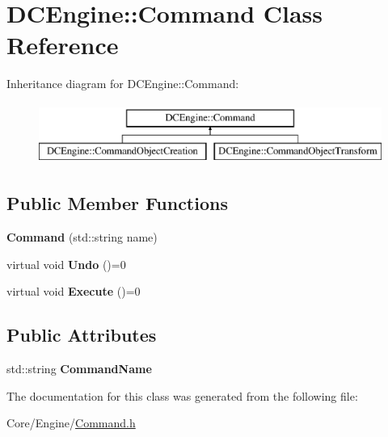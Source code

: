\hypertarget{classDCEngine_1_1Command}{\section{D\-C\-Engine\-:\-:Command Class Reference}
\label{classDCEngine_1_1Command}
}
Inheritance diagram for D\-C\-Engine\-:\-:Command\-:\begin{figure}[H]
\begin{center}
\leavevmode
\includegraphics[height=2.000000cm]{classDCEngine_1_1Command}
\end{center}
\end{figure}
\subsection*{Public Member Functions}
\begin{DoxyCompactItemize}
\item 
\hypertarget{classDCEngine_1_1Command_aa35f7e42932a9d03da8df6add2a7c5d5}{{\bfseries Command} (std\-::string name)}\label{classDCEngine_1_1Command_aa35f7e42932a9d03da8df6add2a7c5d5}

\item 
\hypertarget{classDCEngine_1_1Command_a43a8d631d2b3a250a4e1c4192add7f70}{virtual void {\bfseries Undo} ()=0}\label{classDCEngine_1_1Command_a43a8d631d2b3a250a4e1c4192add7f70}

\item 
\hypertarget{classDCEngine_1_1Command_a5d2b11300b4cad6ddc245adaa87aa35a}{virtual void {\bfseries Execute} ()=0}\label{classDCEngine_1_1Command_a5d2b11300b4cad6ddc245adaa87aa35a}

\end{DoxyCompactItemize}
\subsection*{Public Attributes}
\begin{DoxyCompactItemize}
\item 
\hypertarget{classDCEngine_1_1Command_a03f72da121e2d28c0624958fdc85b19e}{std\-::string {\bfseries Command\-Name}}\label{classDCEngine_1_1Command_a03f72da121e2d28c0624958fdc85b19e}

\end{DoxyCompactItemize}


The documentation for this class was generated from the following file\-:\begin{DoxyCompactItemize}
\item 
Core/\-Engine/\hyperlink{Command_8h}{Command.\-h}\end{DoxyCompactItemize}

